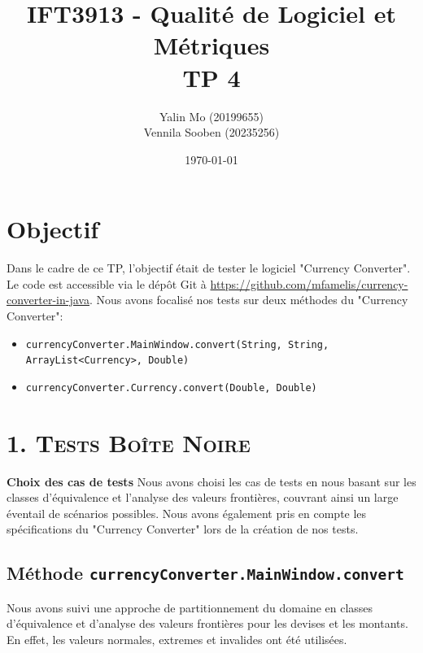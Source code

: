 \documentclass[letterpaper, 10pt]{article}
\title{IFT3913 - Qualité de Logiciel et Métriques \\ TP 4}
\author{Yalin Mo (20199655) \\ Vennila Sooben (20235256)}
\date{\today}
\begin{document}
\maketitle

\section*{Objectif}
Dans le cadre de ce TP, l'objectif était de tester le logiciel "Currency Converter". Le code est accessible via le dépôt Git à \url{https://github.com/mfamelis/currency-converter-in-java}. Nous avons focalisé nos tests sur deux méthodes du "Currency Converter":
\begin{itemize}
    \item \texttt{currencyConverter.MainWindow.convert(String, String, ArrayList<Currency>, Double)}
    \item \texttt{currencyConverter.Currency.convert(Double, Double)}
\end{itemize}

\section*{\textsc{1. Tests Boîte Noire}}
\item \textbf{Choix des cas de tests}
Nous avons choisi les cas de tests en nous basant sur les classes d'équivalence et l'analyse des valeurs frontières, couvrant ainsi un large éventail de scénarios possibles. Nous avons également pris en compte les spécifications du "Currency Converter" lors de la création de nos tests.


\subsection*{Méthode \texttt{currencyConverter.MainWindow.convert}}
Nous avons suivi une approche de partitionnement du domaine en classes d'équivalence et d'analyse des valeurs frontières pour les devises et les montants. En effet, les valeurs normales, extremes et invalides ont été utilisées.
\end{document}

